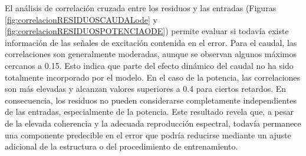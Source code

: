 \documentclass[11pt]{report}
\begin{document}
El análisis de correlación cruzada entre los residuos y las entradas (Figuras \ref{fig:correlacionRESIDUOSCAUDALode} y \ref{fig:correlacionRESIDUOSPOTENCIAODE}) permite evaluar si todavía existe información de las señales de excitación contenida en el error. Para el caudal, las correlaciones son generalmente moderadas, aunque se observan algunos máximos cercanos a 0.15. Esto indica que parte del efecto dinámico del caudal no ha sido totalmente incorporado por el modelo. En el caso de la potencia, las correlaciones son más elevadas y alcanzan valores superiores a 0.4 para ciertos retardos. En consecuencia, los residuos no pueden considerarse completamente independientes de las entradas, especialmente de la potencia. Este resultado revela que, a pesar de la elevada coherencia y la adecuada reproducción espectral, todavía permanece una componente predecible en el error que podría reducirse mediante un ajuste adicional de la estructura o del procedimiento de entrenamiento.
\end{document}
